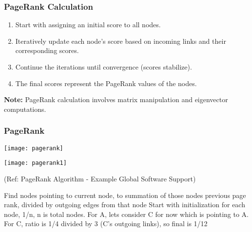 \begin{frame}[fragile]\frametitle{PageRank Calculation}
\begin{enumerate}
\item Start with assigning an initial score to all nodes.
\item Iteratively update each node's score based on incoming links and their corresponding scores.
\item Continue the iterations until convergence (scores stabilize).
\item The final scores represent the PageRank values of the nodes.
\end{enumerate}

\textbf{Note:} PageRank calculation involves matrix manipulation and eigenvector computations.
\end{frame}

\begin{frame}[fragile]\frametitle{PageRank}

\begin{center}
\texttt{[image: pagerank]}

\texttt{[image: pagerank1]}

{\tiny (Ref: PageRank Algorithm - Example Global Software Support)}
\end{center}	  

Find nodes pointing to current node, to summation of those nodes previous page rank, divided by outgoing edges from that node
Start with initialization for each node, 1/n, n is total nodes. For A, lets consider C for now which is pointing to A. For C, ratio is 1/4 divided by 3 (C's outgoing links), so final is 1/12


\end{frame}


